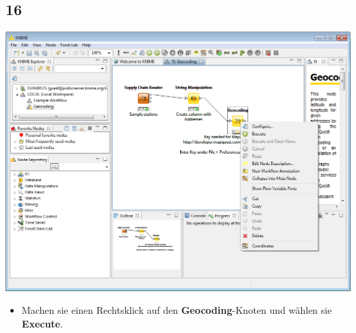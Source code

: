 \documentclass{beamer}
\begin{document}
\subsection{16}
\begin{frame}
	\begin{center}
  		\includegraphics[height=0.6\textheight]{16.png}
	\end{center}
	\begin{itemize}
		\item Machen sie einen Rechtsklick auf den \textbf{Geocoding}-Knoten und wählen sie \textbf{Execute}.
	\end{itemize}
\end{frame}
\end{document}
